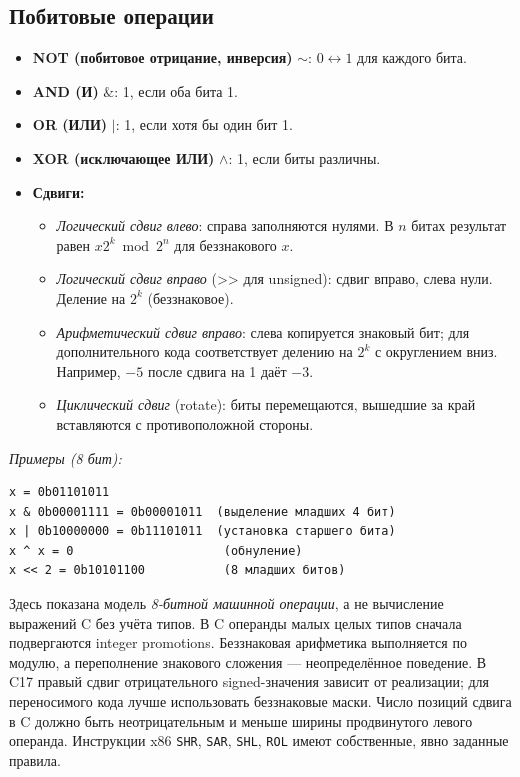 \subsection{Побитовые операции}
\begin{itemize}
    \item \textbf{NOT (побитовое отрицание, инверсия)} $\sim$: $0\leftrightarrow 1$ для каждого бита.
    \item \textbf{AND (И)} $\&$: 1, если оба бита 1.
    \item \textbf{OR (ИЛИ)} $|$: 1, если хотя бы один бит 1.
    \item \textbf{XOR (исключающее ИЛИ)} $\wedge$: 1, если биты различны.
    \item \textbf{Сдвиги:}
    \begin{itemize}
        \item \textit{Логический сдвиг влево}: справа заполняются нулями.
        В $n$ битах результат равен $x2^k\bmod 2^n$ для беззнакового $x$.
        \item \textit{Логический сдвиг вправо} (>> для unsigned): сдвиг вправо, слева нули. Деление на $2^k$ (беззнаковое).
        \item \textit{Арифметический сдвиг вправо}: слева копируется
        знаковый бит; для дополнительного кода соответствует делению
        на $2^k$ с округлением вниз. Например, $-5$ после сдвига на 1 даёт $-3$.
        \item \textit{Циклический сдвиг} (rotate): биты перемещаются, вышедшие за край вставляются с противоположной стороны.
    \end{itemize}
\end{itemize}

\textit{Примеры (8 бит):}
\begin{verbatim}
x = 0b01101011
x & 0b00001111 = 0b00001011  (выделение младших 4 бит)
x | 0b10000000 = 0b11101011  (установка старшего бита)
x ^ x = 0                     (обнуление)
x << 2 = 0b10101100           (8 младших битов)
\end{verbatim}

Здесь показана модель \emph{8-битной машинной операции}, а не вычисление
выражений C без учёта типов. В C операнды малых целых типов сначала
подвергаются integer promotions. Беззнаковая арифметика выполняется
по модулю, а переполнение знакового сложения --- неопределённое поведение.
В C17 правый сдвиг отрицательного signed-значения зависит от реализации;
для переносимого кода лучше использовать беззнаковые маски.
Число позиций сдвига в C должно быть неотрицательным и меньше ширины
продвинутого левого операнда. Инструкции x86 \texttt{SHR}, \texttt{SAR},
\texttt{SHL}, \texttt{ROL} имеют собственные, явно заданные правила.

